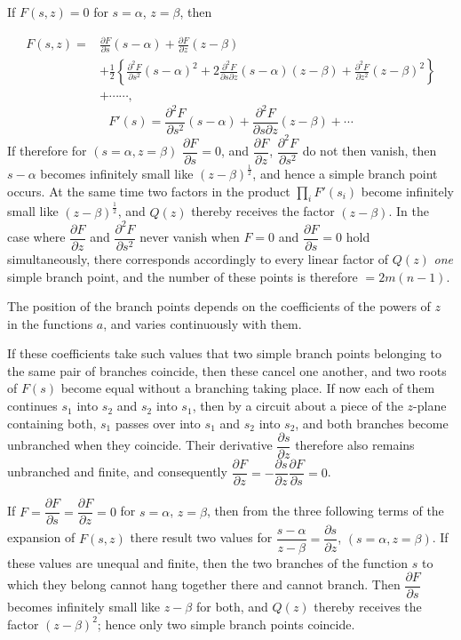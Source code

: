 \documentclass{article}
\begin{document}
If $F(s, z) = 0$ for $s = \alpha$, $z = \beta$, then

\[
\begin{aligned}
F(s, z) ={}& \frac{\partial F}{\partial s}(s-\alpha) + \frac{\partial F}{\partial z}(z-\beta) \\
&+ \tfrac{1}{2}\left\{\frac{\partial^{2}F}{\partial s^{2}}(s-\alpha)^{2} + 2\frac{\partial^{2}F}{\partial s \partial z}(s-\alpha)(z-\beta) + \frac{\partial^{2}F}{\partial z^{2}}(z-\beta)^{2}\right\} \\
&+ \cdots\cdots,
\end{aligned}
\]
\[ F'(s) = \frac{\partial^{2}F}{\partial s^{2}}(s-\alpha) + \frac{\partial^{2}F}{\partial s \partial z}(z-\beta) + \cdots \]
If therefore for $(s = \alpha, z = \beta)$ $\dfrac{\partial F}{\partial s} = 0$, and $\dfrac{\partial F}{\partial z}$, $\dfrac{\partial^{2}F}{\partial s^{2}}$ do not then vanish, then $s-\alpha$ becomes infinitely small like $(z-\beta)^{\frac{1}{2}}$, and hence a simple branch point occurs. At the same time two factors in the product $\displaystyle\prod_{i} F'(s_{i})$ become infinitely small like $(z-\beta)^{\frac{1}{2}}$, and $Q(z)$ thereby receives the factor $(z-\beta)$. In the case where $\dfrac{\partial F}{\partial z}$ and $\dfrac{\partial^{2}F}{\partial s^{2}}$ never vanish when $F = 0$ and $\dfrac{\partial F}{\partial s} = 0$ hold simultaneously, there corresponds accordingly to every linear factor of $Q(z)$ \emph{one} simple branch point, and the number of these points is therefore $= 2m(n-1)$.

The position of the branch points depends on the coefficients of the powers of $z$ in the functions $a$, and varies continuously with them.

If these coefficients take such values that two simple branch points belonging to the same pair of branches coincide, then these cancel one another, and two roots of $F(s)$ become equal without a branching taking place. If now each of them continues $s_{1}$ into $s_{2}$ and $s_{2}$ into $s_{1}$, then by a circuit about a piece of the $z$-plane containing both, $s_{1}$ passes over into $s_{1}$ and $s_{2}$ into $s_{2}$, and both branches become unbranched when they coincide. Their derivative $\dfrac{\partial s}{\partial z}$ therefore also remains unbranched and finite, and consequently $\dfrac{\partial F}{\partial z} = -\dfrac{\partial s}{\partial z} \dfrac{\partial F}{\partial s} = 0$.

If $F = \dfrac{\partial F}{\partial s} = \dfrac{\partial F}{\partial z} = 0$ for $s = \alpha$, $z = \beta$, then from the three following terms of the expansion of $F(s, z)$ there result two values for $\dfrac{s-\alpha}{z-\beta} = \dfrac{\partial s}{\partial z}$, $(s = \alpha, z = \beta)$. If these values are unequal and finite, then the two branches of the function $s$ to which they belong cannot hang together there and cannot branch. Then $\dfrac{\partial F}{\partial s}$ becomes infinitely small like $z-\beta$ for both, and $Q(z)$ thereby receives the factor $(z-\beta)^{2}$; hence only two simple branch points coincide.
\end{document}
